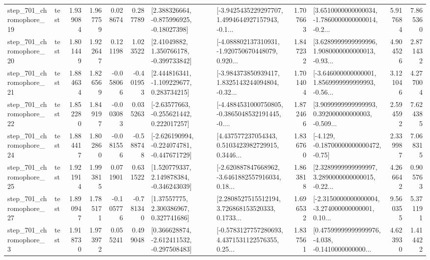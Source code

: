 \begin{tabular}{llrrrrllrlrr}
  step\_701\_chromophore\_19 &      test &      1.939084 &    1.967759 &      0.028674 &  0.287789 &    [2.388326664, -0.875996925, -0.18027398] &  [-3.9425435229297707, 1.4994644927157943, -0.1... &       1.707663 &  [3.6510000000000034, -1.7860000000000014, -0.2... &            5.917684 &          7.865360 \\
  step\_701\_chromophore\_20 &      test &      1.801449 &    1.922647 &      0.121198 &  1.023522 &     [2.41049882, 1.350766178, -0.399733842] &  [-4.088802137310931, -1.920750670448079, 0.920... &       1.847232 &  [3.6289999999999996, 1.9080000000000013, -0.93... &            4.904526 &          2.871432 \\
  step\_701\_chromophore\_21 &      test &      1.884634 &    1.826569 &     -0.058066 & -0.401953 &    [2.444816341, -1.109229677, 0.283734215] &  [-3.984373850939417, 1.8325143244094804, -0.32... &       1.701404 &  [-3.646000000000001, 1.8569999999999993, -0.56... &            3.121046 &          4.277004 \\
  step\_701\_chromophore\_22 &      test &      1.852280 &    1.849197 &     -0.003083 &  0.035263 &    [-2.63577663, -0.255621442, 0.222017257] &  [-4.4884531000750805, -0.3865048532191445, -0.... &       1.872466 &  [3.9099999999999993, 0.392000000000003, -0.509... &            2.594592 &          7.624385 \\
  step\_701\_chromophore\_24 &      test &      1.884417 &    1.802860 &     -0.081556 & -0.588748 &  [-2.626190994, -0.224074781, -0.447671729] &  [4.437577237054343, 0.5103423982729915, 0.3446... &       1.836760 &              [-4.129, -0.18700000000000472, -0.75] &            2.339987 &          7.068315 \\
  step\_701\_chromophore\_25 &      test &      1.921914 &    1.993815 &      0.071901 &  0.631522 &    [1.520779337, 2.149878384, -0.346243039] &  [-2.620887847668962, -3.6461882557916034, 0.18... &       1.863818 &  [2.3289999999999997, 3.2890000000000015, -0.22... &            4.266642 &          0.905763 \\
  step\_701\_chromophore\_27 &      test &      1.890947 &    1.785171 &     -0.105776 & -0.781340 &      [1.37557775, 2.300386967, 0.327741686] &  [2.2808527515512194, 3.726868153520333, 0.1733... &       1.696532 &  [-2.3150000000000004, -3.274000000000001, 0.10... &            9.560355 &          5.371191 \\
   step\_701\_chromophore\_3 &      test &      1.918730 &    1.973972 &      0.055241 &  0.499048 &   [0.366628874, -2.612411532, -0.297508483] &  [-0.5783127757280693, 4.4371531122576355, 0.25... &       1.837561 &  [0.47599999999999976, -4.038, -0.1410000000000... &            4.623930 &          1.414422 \\

\end{tabular}
